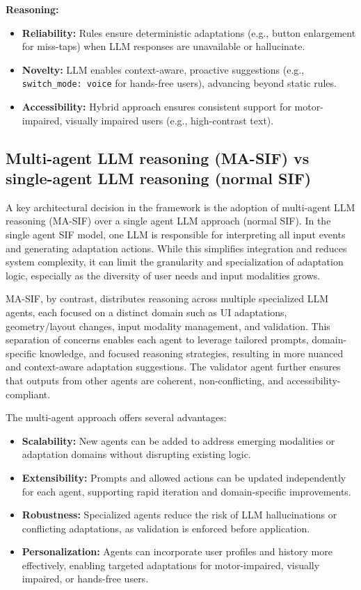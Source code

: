 \documentclass[openany]{book}
\begin{document}
\textbf{Reasoning:}
\begin{itemize}
  \item \textbf{Reliability:} Rules ensure deterministic adaptations (e.g., button enlargement for miss-taps) when LLM responses are unavailable or hallucinate.
  \item \textbf{Novelty:} LLM enables context-aware, proactive suggestions (e.g., \verb|switch_mode: voice| for hands-free users), advancing beyond static rules.
  \item \textbf{Accessibility:} Hybrid approach ensures consistent support for motor-impaired, visually impaired users (e.g., high-contrast text).
\end{itemize}

\subsection{Multi-agent LLM reasoning (MA-SIF) vs single-agent LLM reasoning (normal SIF)}
A key architectural decision in the framework is the adoption of multi-agent LLM reasoning (MA-SIF) over a single agent LLM approach (normal SIF). In the single agent SIF model, one LLM is responsible for interpreting all input events and generating adaptation actions. While this simplifies integration and reduces system complexity, it can limit the granularity and specialization of adaptation logic, especially as the diversity of user needs and input modalities grows.

MA-SIF, by contrast, distributes reasoning across multiple specialized LLM agents, each focused on a distinct domain such as UI adaptations, geometry/layout changes, input modality management, and validation. This separation of concerns enables each agent to leverage tailored prompts, domain-specific knowledge, and focused reasoning strategies, resulting in more nuanced and context-aware adaptation suggestions. The validator agent further ensures that outputs from other agents are coherent, non-conflicting, and accessibility-compliant.

The multi-agent approach offers several advantages: \begin{itemize} \item \textbf{Scalability:} New agents can be added to address emerging modalities or adaptation domains without disrupting existing logic. \item \textbf{Extensibility:} Prompts and allowed actions can be updated independently for each agent, supporting rapid iteration and domain-specific improvements. \item \textbf{Robustness:} Specialized agents reduce the risk of LLM hallucinations or conflicting adaptations, as validation is enforced before application. \item \textbf{Personalization:} Agents can incorporate user profiles and history more effectively, enabling targeted adaptations for motor-impaired, visually impaired, or hands-free users. \end{itemize}
\end{document}
